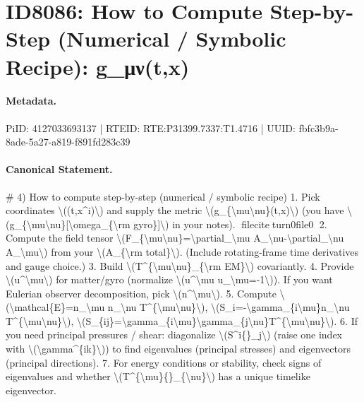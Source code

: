 \section*{ID8086: How to Compute Step-by-Step (Numerical / Symbolic Recipe): g\_μν(t,x)}
\paragraph{Metadata.}
PiID: 4127033693137 | RTEID: RTE:P31399.7337:T1.4716 | UUID: fbfc3b9a-8ade-5a27-a819-f891fd283c39

\paragraph{Canonical Statement.}
\# 4) How to compute step-by-step (numerical / symbolic recipe) 1. Pick coordinates \textbackslash{}((t,x\textasciicircum{}i)\textbackslash{}) and supply the metric \textbackslash{}(g\_\{\textbackslash{}mu\textbackslash{}nu\}(t,x)\textbackslash{}) (you have \textbackslash{}(g\_\{\textbackslash{}mu\textbackslash{}nu\}[\textbackslash{}omega\_\{\textbackslash{}rm gyro\}]\textbackslash{}) in your notes). fileciteturn0file0 2. Compute the field tensor \textbackslash{}(F\_\{\textbackslash{}mu\textbackslash{}nu\}=\textbackslash{}partial\_\textbackslash{}mu A\_\textbackslash{}nu-\textbackslash{}partial\_\textbackslash{}nu A\_\textbackslash{}mu\textbackslash{}) from your \textbackslash{}(A\_\{\textbackslash{}rm total\}\textbackslash{}). (Include rotating-frame time derivatives and gauge choice.) 3. Build \textbackslash{}(T\textasciicircum{}\{\textbackslash{}mu\textbackslash{}nu\}\_\{\textbackslash{}rm EM\}\textbackslash{}) covariantly. 4. Provide \textbackslash{}(u\textasciicircum{}\textbackslash{}mu\textbackslash{}) for matter/gyro (normalize \textbackslash{}(u\textasciicircum{}\textbackslash{}mu u\_\textbackslash{}mu=-1\textbackslash{})). If you want Eulerian observer decomposition, pick \textbackslash{}(n\textasciicircum{}\textbackslash{}mu\textbackslash{}). 5. Compute \textbackslash{}(\textbackslash{}mathcal\{E\}=n\_\textbackslash{}mu n\_\textbackslash{}nu T\textasciicircum{}\{\textbackslash{}mu\textbackslash{}nu\}\textbackslash{}), \textbackslash{}(S\_i=-\textbackslash{}gamma\_\{i\textbackslash{}mu\}n\_\textbackslash{}nu T\textasciicircum{}\{\textbackslash{}mu\textbackslash{}nu\}\textbackslash{}), \textbackslash{}(S\_\{ij\}=\textbackslash{}gamma\_\{i\textbackslash{}mu\}\textbackslash{}gamma\_\{j\textbackslash{}nu\}T\textasciicircum{}\{\textbackslash{}mu\textbackslash{}nu\}\textbackslash{}). 6. If you need principal pressures / shear: diagonalize \textbackslash{}(S\textasciicircum{}i\{\}\_j\textbackslash{}) (raise one index with \textbackslash{}(\textbackslash{}gamma\textasciicircum{}\{ik\}\textbackslash{})) to find eigenvalues (principal stresses) and eigenvectors (principal directions). 7. For energy conditions or stability, check signs of eigenvalues and whether \textbackslash{}(T\textasciicircum{}\{\textbackslash{}mu\}\{\}\_\{\textbackslash{}nu\}\textbackslash{}) has a unique timelike eigenvector.


